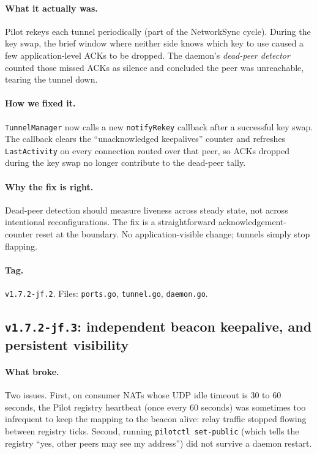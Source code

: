 \documentclass[11pt,a4paper]{article}
\begin{document}
\paragraph{What it actually was.} Pilot rekeys each tunnel
periodically (part of the NetworkSync cycle). During the key
swap, the brief window where neither side knows which key to use
caused a few application-level ACKs to be dropped. The daemon's
\emph{dead-peer detector} counted those missed ACKs as silence
and concluded the peer was unreachable, tearing the tunnel down.

\paragraph{How we fixed it.} \texttt{TunnelManager} now calls a
new \texttt{notifyRekey} callback after a successful key swap.
The callback clears the ``unacknowledged keepalives'' counter
and refreshes \texttt{LastActivity} on every connection routed
over that peer, so ACKs dropped during the key swap no longer
contribute to the dead-peer tally.

\paragraph{Why the fix is right.} Dead-peer detection should
measure liveness across steady state, not across intentional
reconfigurations. The fix is a straightforward
acknowledgement-counter reset at the boundary. No
application-visible change; tunnels simply stop flapping.

\paragraph*{Tag.} \texttt{v1.7.2-jf.2}. Files: \texttt{ports.go},
\texttt{tunnel.go}, \texttt{daemon.go}.

\subsection{\texttt{v1.7.2-jf.3}: independent beacon keepalive, and
persistent visibility}

\paragraph{What broke.} Two issues. First, on consumer NATs
whose UDP idle timeout is 30 to 60 seconds, the Pilot registry
heartbeat (once every 60 seconds) was sometimes too infrequent
to keep the mapping to the beacon alive: relay traffic stopped
flowing between registry ticks. Second, running
\texttt{pilotctl set-public} (which tells the registry ``yes,
other peers may see my address'') did not survive a daemon
restart.
\end{document}
